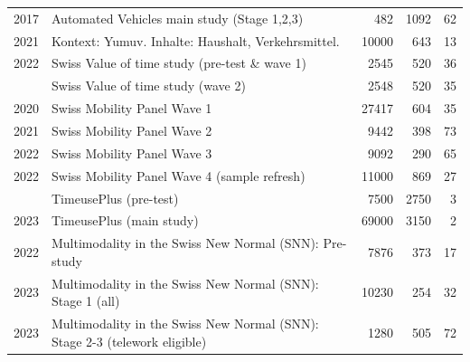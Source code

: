 \documentclass[a4paper]{article}\usepackage[]{graphicx}\usepackage[]{xcolor}
\begin{document}
\begin{landscape}
\begin{longtable}[t]{rlrrr}
2017 & Automated Vehicles main study (Stage 1,2,3) & 482 & 1092 & 62\\
2021 & Kontext: Yumuv. Inhalte: Haushalt, Verkehrsmittel. & 10000 & 643 & 13\\
2022 & Swiss Value of time study (pre-test \& wave 1) & 2545 & 520 & 36\\
\addlinespace
2022 & Swiss Value of time study (wave 2) & 2548 & 520 & 35\\
2020 & Swiss Mobility Panel Wave 1 & 27417 & 604 & 35\\
2021 & Swiss Mobility Panel Wave 2 & 9442 & 398 & 73\\
2022 & Swiss Mobility Panel Wave 3 & 9092 & 290 & 65\\
2022 & Swiss Mobility Panel Wave 4 (sample refresh) & 11000 & 869 & 27\\
\addlinespace
2022 & TimeusePlus (pre-test) & 7500 & 2750 & 3\\
2023 & TimeusePlus (main study) & 69000 & 3150 & 2\\
2022 & Multimodality in the Swiss New Normal (SNN): Pre-study & 7876 & 373 & 17\\
2023 & Multimodality in the Swiss New Normal (SNN): Stage 1 (all) & 10230 & 254 & 32\\
2023 & Multimodality in the Swiss New Normal (SNN): Stage 2-3 (telework eligible) & 1280 & 505 & 72\\*
\end{longtable}
\end{landscape}
\end{document}
